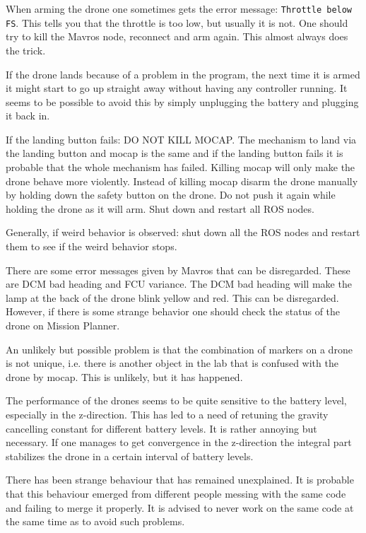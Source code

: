 \documentclass[titlepage,11pt,a4paper]{article}
\begin{document}
When arming the drone one sometimes gets the error message:
\texttt{Throttle below FS}. This tells you that the throttle is too
low, but usually it is not. One should try to kill the Mavros node,
reconnect and arm again. This almost always does the trick.

If the drone lands because of a problem in the program, the next time
it is armed it might start to go up straight away without having any
controller running. It seems to be possible to avoid this by simply
unplugging the battery and plugging it back in.

If the landing button fails: DO NOT KILL MOCAP. The mechanism to land
via the landing button and mocap is the same and if the landing button
fails it is probable that the whole mechanism has failed. Killing
mocap will only make the drone behave more violently. Instead of
killing mocap disarm the drone manually by holding down the safety
button on the drone. Do not push it again while holding the drone as
it will arm. Shut down and restart all ROS nodes.

Generally, if weird behavior is observed: shut down all the ROS nodes
and restart them to see if the weird behavior stops.

There are some error messages given by Mavros that can be
disregarded. These are DCM bad heading and FCU variance. The DCM bad
heading will make the lamp at the back of the drone blink yellow and
red. This can be disregarded. However, if there is some strange
behavior one should check the status of the drone on Mission Planner.

An unlikely but possible problem is that the combination of markers on
a drone is not unique, i.e. there is another object in the lab that is
confused with the drone by mocap. This is unlikely, but it has
happened.

The performance of the drones seems to be quite sensitive to the
battery level, especially in the z-direction. This has led to a need
of retuning the gravity cancelling constant for different battery
levels. It is rather annoying but necessary. If one manages to get
convergence in the z-direction the integral part stabilizes the drone
in a certain interval of battery levels.

There has been strange behaviour that has remained unexplained. It is
probable that this behaviour emerged from different people messing
with the same code and failing to merge it properly. It is advised to
never work on the same code at the same time as to avoid such
problems.
\end{document}
